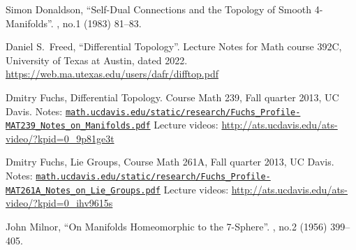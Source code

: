 \begin{thebibliography}{99}
  Simon Donaldson,
  ``Self-Dual Connections and the Topology of Smooth 4-Manifolds''.
  , no.1 (1983) 81--83.

  Daniel S.~Freed,
  ``Differential Topology''.
  Lecture Notes for Math course 392C, University of Texas at Austin, dated 2022.\newline
  \url{https://web.ma.utexas.edu/users/dafr/difftop.pdf}

  Dmitry Fuchs,
  Differential Topology.
  Course Math 239, Fall quarter 2013, UC Davis.\newline
  Notes: \href{https://www.math.ucdavis.edu/static/research/Fuchs_Profile-MAT239_Notes_on_Manifolds.pdf}{\mbox{\texttt{math.ucdavis.edu/static/research/Fuchs\_Profile-MAT239\_Notes\_on\_Manifolds.pdf}}}\newline
  Lecture videos: \url{http://ats.ucdavis.edu/ats-video/?kpid=0_9p81ge3t}

  Dmitry Fuchs,
  Lie Groups,
  Course Math 261A, Fall quarter 2013, UC Davis.\newline
  Notes: \href{https://www.math.ucdavis.edu/static/research/Fuchs_Profile-MAT261A_Notes_on_Lie_Groups.pdf}{\mbox{\texttt{math.ucdavis.edu/static/research/Fuchs\_Profile-MAT261A\_Notes\_on\_Lie\_Groups.pdf}}}
  Lecture videos: \url{http://ats.ucdavis.edu/ats-video/?kpid=0_ihv9615s}

  John Milnor,
  ``On Manifolds Homeomorphic to the 7-Sphere''.
   , no.2 (1956) 399--405.\newline
  {\tt{}}
\end{thebibliography}
